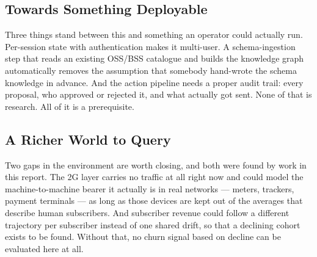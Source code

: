 \subsection{Towards Something Deployable}

Three things stand between this and something an operator could actually run.
Per-session state with authentication makes it multi-user. A schema-ingestion
step that reads an existing OSS/BSS catalogue and builds the knowledge graph
automatically removes the assumption that somebody hand-wrote the schema
knowledge in advance. And the action pipeline needs a proper audit trail: every
proposal, who approved or rejected it, and what actually got sent. None of that
is research. All of it is a prerequisite.

\subsection{A Richer World to Query}

Two gaps in the environment are worth closing, and both were found by work in
this report. The 2G layer carries no traffic at all right now and could model
the machine-to-machine bearer it actually is in real networks --- meters,
trackers, payment terminals --- as long as those devices are kept out of the
averages that describe human subscribers. And subscriber revenue could follow a
different trajectory per subscriber instead of one shared drift, so that a
declining cohort exists to be found. Without that, no churn signal based on
decline can be evaluated here at all.
